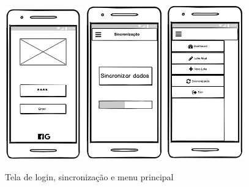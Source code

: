 \begin{anexosenv}
\begin{figure}[h]
    \centering
    \caption{Tela de login, sincronização e menu principal}
    \includegraphics[width=0.3\textwidth]{./dados/figuras/p1.png}
    \includegraphics[width=0.3\textwidth]{./dados/figuras/p2.png}
    \includegraphics[width=0.3\textwidth]{./dados/figuras/p3.png}
    \label{fig:p1}
\end{figure}


\end{anexosenv}
